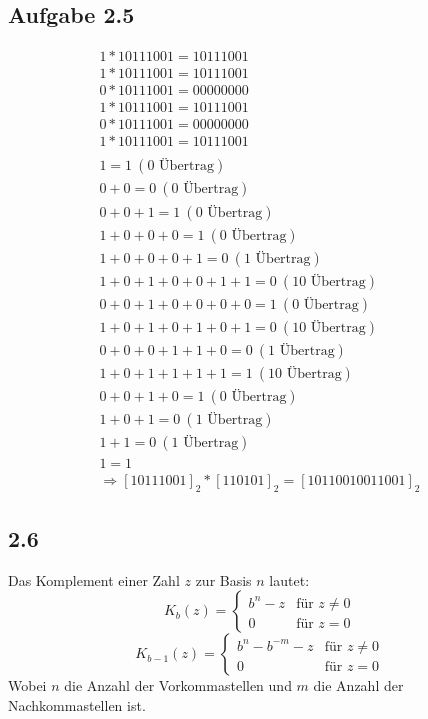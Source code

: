 \documentclass[12pt,a4paper]{article}
\begin{document}
\subsection*{Aufgabe 2.5}
\begin{align*}
1 * 10111001 = 10111001 \\
1 * 10111001 = 10111001 \\
0 * 10111001 = 00000000 \\
1 * 10111001 = 10111001 \\
0 * 10111001 = 00000000 \\
1 * 10111001 = 10111001 \\
\\
1 = 1 ~(0 \textrm{ Übertrag}) \\
0 + 0 = 0 ~(0 \textrm{ Übertrag}) \\
0 + 0 + 1 = 1 ~(0 \textrm{ Übertrag}) \\
1 + 0 + 0 + 0 = 1 ~(0 \textrm{ Übertrag}) \\
1 + 0 + 0 + 0 + 1 = 0 ~(1 \textrm{ Übertrag}) \\
1 + 0 + 1 + 0 + 0 + 1 + 1 = 0 ~(10 \textrm{ Übertrag}) \\
0 + 0 + 1 + 0 + 0 + 0 + 0 = 1 ~(0 \textrm{ Übertrag}) \\
1 + 0 + 1 + 0 + 1 + 0 + 1 = 0 ~(10 \textrm{ Übertrag}) \\
0 + 0 + 0 + 1 + 1 + 0 = 0 ~(1 \textrm{ Übertrag}) \\
1 + 0 + 1 + 1 + 1 + 1 = 1 ~(10 \textrm{ Übertrag}) \\
0 + 0 + 1 + 0 = 1 ~(0 \textrm{ Übertrag}) \\
1 + 0 + 1 = 0 ~(1 \textrm{ Übertrag}) \\
1 + 1 = 0 ~(1 \textrm{ Übertrag}) \\
1 = 1 \\
\Rightarrow [10111001]_{2} * [110101]_{2} = [10110010011001]_{2}
\end{align*}
 
 
 
 \subsection*{2.6} 
 Das Komplement einer Zahl $z$ zur Basis $n$ lautet: 
 $$K_b(z) = \begin{cases} b^n− z & \textrm{für } z \neq 0\\
0& \textrm{für } z = 0\end{cases}$$
$$K_{b-1}(z) =  \begin{cases} b^n - b^{-m}− z & \textrm{für } z \neq 0\\
0& \textrm{für } z = 0\end{cases}$$
 Wobei $n$ die Anzahl der Vorkommastellen und $m$ die Anzahl der Nachkommastellen ist.
\end{document}
